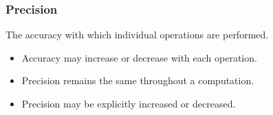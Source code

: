 \begin{frame}

\frametitle{Precision}

\vspace{\fill}

\begin{center}

The accuracy with which individual operations are performed.

\end{center}

\vspace{\fill}

\begin{itemize}

\item Accuracy may increase or decrease with each operation.

\item Precision remains the same throughout a computation.

\item Precision may be explicitly increased or decreased.

\end{itemize}

\vspace{\fill}

\end{frame}

